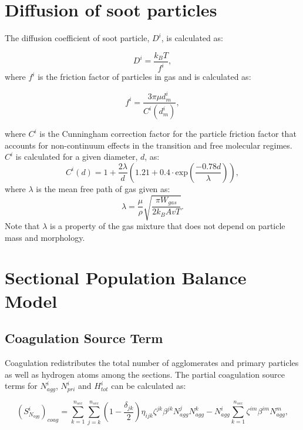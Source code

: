 \section{Diffusion of soot particles}
The diffusion coefficient of soot particle, $D^i$, is calculated as:

\begin{equation}
	D^i = \frac{k_B T}{f^i}
	\label{eqn:diff},
\end{equation}
\noindent where $f^i$ is the friction factor of particles in gas and is calculated as:

\begin{equation}
	f^i = \frac{3\pi\mu d^i_m}{C^i(d^i_m)},
	\label{eqn:fraction}
\end{equation}

\noindent where ${C^i}$ is the Cunningham correction factor for the particle friction factor that accounts for non-continuum effects in the transition and free molecular regimes. ${C^i}$ is calculated for a given diameter, $d$, as: 
\begin{equation}
	C^i(d) = 1+\frac{2\lambda}{d}
	\left(
	1.21+0.4\cdot\mathrm{exp}(\frac{-0.78d}{\lambda})
	\right)
	\label{eqn:cun},
\end{equation}
\noindent  where $\lambda$ is the mean free path of gas given as:
\begin{equation}
	\lambda = \frac{\mu}{\rho}\sqrt{\frac{\pi W_{gas}}{2k_B Av T}}
	\label{eqn:lambda}.
\end{equation}
Note that $\lambda$ is a property of the gas mixture that does not depend on particle mass and morphology. 

\section{Sectional Population Balance Model}
\label{sec:sectextra}

\subsection{Coagulation Source Term}
\label{sec:sectcoagsource}
Coagulation redistributes the total number of agglomerates and primary particles as well as hydrogen atoms among the sections. The partial coagulation source terms for ${N^i_{agg}}$, ${N^i_{pri}}$ and ${H^i_{tot}}$ can be calculated as:

\begin{equation}
	\left(S^i_{N_{agg}}\right)_{coag}
	=
	\sum_{k=1}^{n_{sec}}\sum_{j=k}^{n_{sec}}
	\left(
	1-\frac{\delta_{jk}}{2}
	\right)
	\eta_{ijk}\zeta^{jk}\beta^{jk}N^j_{agg}N^k_{agg}
	-
	N^i_{agg}
	\sum_{k=1}^{n_{sec}}\zeta^{im}\beta^{im}N^m_{agg},
	\label{eqn:IcoagNaggsect}
\end{equation}

